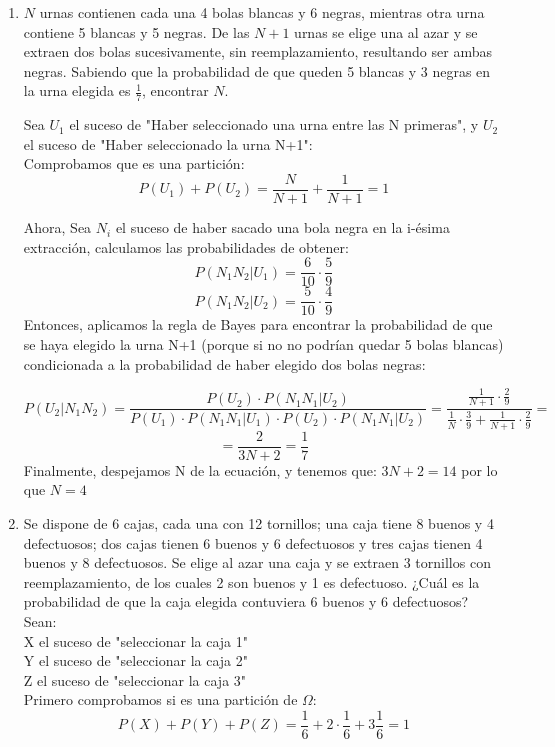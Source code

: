 \documentclass[a4paper,12pt]{article}
\begin{document}
\begin{enumerate}[label=\textbf{\arabic*.}]
    \item \( N \) urnas contienen cada una 4 bolas blancas y 6 negras, mientras otra urna contiene 5 blancas y 5 negras. De las \( N + 1 \) urnas se elige una al azar y se extraen dos bolas sucesivamente, sin reemplazamiento, resultando ser ambas negras. Sabiendo que la probabilidad de que queden 5 blancas y 3 negras en la urna elegida es \( \frac{1}{7} \), encontrar \( N \).
    
    Sea $U_1$ el suceso de "Haber seleccionado una urna entre las N primeras", y $U_2$ el suceso de "Haber seleccionado la urna N+1":\\

    Comprobamos que es una partición: 
    $$P(U_1)+P(U_2)=\frac{N}{N+1}+\frac{1}{N+1}=1$$
    
    Ahora, Sea $N_i$ el suceso de haber sacado una bola negra en la i-ésima extracción, calculamos las probabilidades de obtener:
    $$P(N_1N_2|U_1)=\frac{6}{10} \cdot \frac{5}{9}$$
    $$P(N_1N_2|U_2)=\frac{5}{10} \cdot \frac{4}{9}$$
    Entonces, aplicamos la regla de Bayes para encontrar la probabilidad de que se haya elegido la urna N+1 (porque si no no podrían quedar 5 bolas blancas) condicionada a la probabilidad de haber elegido dos bolas negras: 
    
    $$P(U_2|N_1N_2)=\frac{P(U_2)\cdot P(N_1N_1|U_2)}{P(U_1)\cdot P(N_1N_1|U_1)\cdot P(U_2)\cdot P(N_1N_1|U_2)}=\frac{\frac{1}{N+1}\cdot \frac{2}{9}}{\frac{1}{N} \cdot \frac{3}{9}+\frac{1}{N+1}\cdot\frac{2}{9}}=$$
    $$=\frac{2}{3N+2}=\frac{1}{7}$$
    Finalmente, despejamos N de la ecuación, y tenemos que: $3N+2 = 14$ por lo que $N=4$
    
    \item Se dispone de 6 cajas, cada una con 12 tornillos; una caja tiene 8 buenos y 4 defectuosos; dos cajas tienen 6 buenos y 6 defectuosos y tres cajas tienen 4 buenos y 8 defectuosos. Se elige al azar una caja y se extraen 3 tornillos con reemplazamiento, de los cuales 2 son buenos y 1 es defectuoso. ¿Cuál es la probabilidad de que la caja elegida contuviera 6 buenos y 6 defectuosos?\\
    Sean:\\
    X el suceso de "seleccionar la caja 1"\\
    Y el suceso de "seleccionar la caja 2"\\
    Z el suceso de "seleccionar la caja 3"\\

    Primero comprobamos si es una partición de $\Omega$: 
    $$P(X)+P(Y)+P(Z)=\frac{1}{6}+2\cdot \frac{1}{6}+3\frac{1}{6}=1$$


\end{enumerate}
\end{document}
